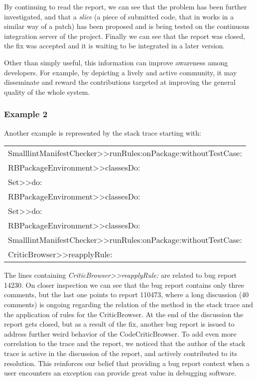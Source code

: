 By continuing to read the report, we can see that the problem has been further investigated, and that a \emph{slice} (a piece of submitted code, that in \pha works in a similar way of a patch) has been proposed and is being tested on the continuous integration server of the project.
Finally we can see that the report was closed, the fix was accepted and it is waiting to be integrated in a later version.

Other than simply useful, this information can improve awareness among developers.
For example, by depicting a lively and active community, it may disseminate and reward the contributions targeted at improving the general quality of the whole system.


\subsubsection{Example 2} Another example is represented by the stack trace starting with:

\begin{center}\small
\begin{tabular}{l}
SmalllintManifestChecker{>}{>}runRules:onPackage:withoutTestCase: \\
RBPackageEnvironment{>}{>}classesDo: \\
Set{>}{>}do: \\
RBPackageEnvironment{>}{>}classesDo: \\
Set{>}{>}do: \\
RBPackageEnvironment{>}{>}classesDo: \\
SmalllintManifestChecker{>}{>}runRules:onPackage:withoutTestCase: \\
CriticBrowser{>}{>}reapplyRule:
\end{tabular}
\end{center}


The lines containing \emph{CriticBrowser{>}{>}reapplyRule:} are related to bug report 14230.
On closer inspection we can see that the bug report contains only three comments, but the last one points to report 110473, where a long discussion (40 comments) is ongoing regarding the relation of the method in the stack trace and the application of rules for the CriticBrowser.
At the end of the discussion the report gets closed, but as a result of the fix, another bug report is issued to address further weird behavior of the CodeCriticBrowser.
To add even more correlation to the trace and the report, we noticed that the author of the stack trace is active in the discussion of the report, and actively contributed to its resolution.
This reinforces our belief that providing a bug report context when a user encounters an exception can provide great value in debugging software.





